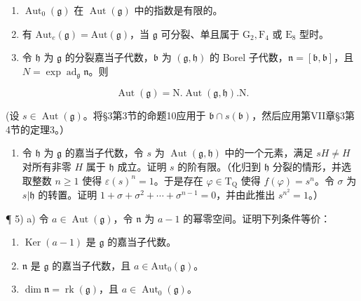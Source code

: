 
\begin{enumerate}
\def\labelenumi{\arabic{enumi})}
\item
  \(\operatorname{Aut}_{0}(\mathfrak{g})\) 在 \(\operatorname{Aut}(\mathfrak{g})\) 中的指数是有限的。
\item
  有 \(\mathrm{Aut}_e(\mathfrak{g}) = \mathrm{Aut}(\mathfrak{g})\)，当 \(\mathfrak{g}\) 可分裂、单且属于 \(\mathrm{G}_2, \mathrm{F}_4\) 或 \(\mathrm{E}_8\) 型时。
\item
  令 \(\mathfrak{h}\) 为 \(\mathfrak{g}\) 的分裂嘉当子代数，\(\mathfrak{b}\) 为 \((\mathfrak{g},\mathfrak{h})\) 的 Borel 子代数，\(\mathfrak{n} = [\mathfrak{b},\mathfrak{b}]\)，且 \(N = \exp \operatorname{ad}_{\mathfrak{g}}\mathfrak{n}\)。则
\end{enumerate}

\[
\operatorname{Aut} (\mathfrak {g}) = \mathrm{N}. \operatorname{Aut} (\mathfrak {g}, \mathfrak {h}). \mathrm{N}.
\]

(设 \(s \in \operatorname{Aut}(\mathfrak{g})\)。将§3第3节的命题10应用于 \(\mathfrak{b} \cap s(\mathfrak{b})\)，然后应用第VII章§3第4节的定理3。）

\begin{enumerate}
\def\labelenumi{\arabic{enumi})}
\setcounter{enumi}{3}
\tightlist
\item
  令 \(\mathfrak{h}\) 为 \(\mathfrak{g}\) 的嘉当子代数，令 \(s\) 为 \(\operatorname{Aut}(\mathfrak{g},\mathfrak{h})\) 中的一个元素，满足 \(sH \neq H\) 对所有非零 \(H\) 属于 \(\mathfrak{h}\) 成立。证明 \(s\) 的阶有限。（化归到 \(\mathfrak{h}\) 分裂的情形，并选取整数 \(n \geq 1\) 使得 \(\varepsilon(s)^n = 1\)。于是存在 \(\varphi \in \mathrm{T}_{\mathrm{Q}}\) 使得 \(f(\varphi) = s^n\)。令 \(\sigma\) 为 \(s|\mathfrak{h}\) 的转置。证明 \(1 + \sigma + \sigma^2 + \cdots + \sigma^{n-1} = 0\)，并由此推出 \(s^{n^2} = 1\)。）
\end{enumerate}

¶ 5) a) 令 \(a \in \operatorname{Aut}(\mathfrak{g})\)，令 \(\mathfrak{n}\) 为 \(a - 1\) 的幂零空间。证明下列条件等价：

\begin{enumerate}
\def\labelenumi{(\roman{enumi})}
\item
  \(\operatorname{Ker}(a - 1)\) 是 \(\mathfrak{g}\) 的嘉当子代数。
\item
  \(\mathfrak{n}\) 是 \(\mathfrak{g}\) 的嘉当子代数，且 \(a\in \mathrm{Aut}_0(\mathfrak{g})\)。
\item
  \(\dim\mathfrak{n}=\operatorname{rk}(\mathfrak{g})\)，且 \(a\in\operatorname{Aut}_{0}(\mathfrak{g})\)。
\end{enumerate}

